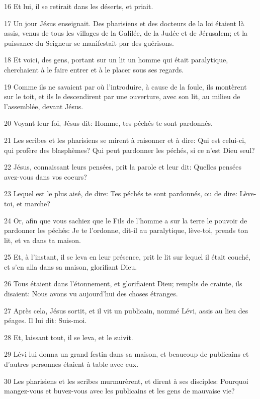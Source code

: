 \par 16 Et lui, il se retirait dans les déserts, et priait.
\par 17 Un jour Jésus enseignait. Des pharisiens et des docteurs de la loi étaient là assis, venus de tous les villages de la Galilée, de la Judée et de Jérusalem; et la puissance du Seigneur se manifestait par des guérisons.
\par 18 Et voici, des gens, portant sur un lit un homme qui était paralytique, cherchaient à le faire entrer et à le placer sous ses regards.
\par 19 Comme ils ne savaient par où l'introduire, à cause de la foule, ils montèrent sur le toit, et ils le descendirent par une ouverture, avec son lit, au milieu de l'assemblée, devant Jésus.
\par 20 Voyant leur foi, Jésus dit: Homme, tes péchés te sont pardonnés.
\par 21 Les scribes et les pharisiens se mirent à raisonner et à dire: Qui est celui-ci, qui profère des blasphèmes? Qui peut pardonner les péchés, si ce n'est Dieu seul?
\par 22 Jésus, connaissant leurs pensées, prit la parole et leur dit: Quelles pensées avez-vous dans vos coeurs?
\par 23 Lequel est le plus aisé, de dire: Tes péchés te sont pardonnés, ou de dire: Lève-toi, et marche?
\par 24 Or, afin que vous sachiez que le Fils de l'homme a sur la terre le pouvoir de pardonner les péchés: Je te l'ordonne, dit-il au paralytique, lève-toi, prends ton lit, et va dans ta maison.
\par 25 Et, à l'instant, il se leva en leur présence, prit le lit sur lequel il était couché, et s'en alla dans sa maison, glorifiant Dieu.
\par 26 Tous étaient dans l'étonnement, et glorifiaient Dieu; remplis de crainte, ils disaient: Nous avons vu aujourd'hui des choses étranges.
\par 27 Après cela, Jésus sortit, et il vit un publicain, nommé Lévi, assis au lieu des péages. Il lui dit: Suis-moi.
\par 28 Et, laissant tout, il se leva, et le suivit.
\par 29 Lévi lui donna un grand festin dans sa maison, et beaucoup de publicains et d'autres personnes étaient à table avec eux.
\par 30 Les pharisiens et les scribes murmurèrent, et dirent à ses disciples: Pourquoi mangez-vous et buvez-vous avec les publicains et les gens de mauvaise vie?
